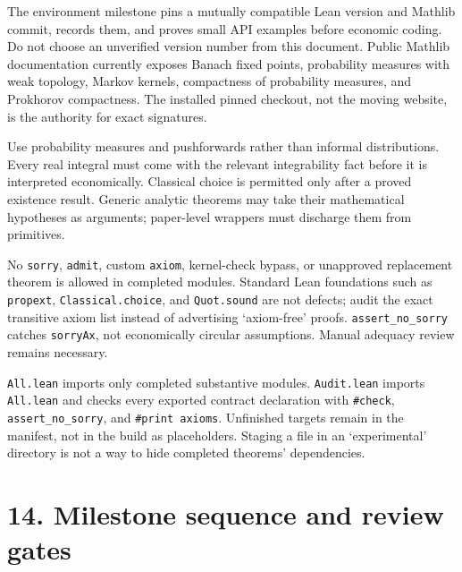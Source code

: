 \documentclass[
  11pt,
]{article}
\begin{document}
The environment milestone pins a mutually compatible Lean version and
Mathlib commit, records them, and proves small API examples before
economic coding. Do not choose an unverified version number from this
document. Public Mathlib documentation currently exposes Banach fixed
points, probability measures with weak topology, Markov kernels,
compactness of probability measures, and Prokhorov compactness. The
installed pinned checkout, not the moving website, is the authority for
exact signatures.

Use probability measures and pushforwards rather than informal
distributions. Every real integral must come with the relevant
integrability fact before it is interpreted economically. Classical
choice is permitted only after a proved existence result. Generic
analytic theorems may take their mathematical hypotheses as arguments;
paper-level wrappers must discharge them from primitives.

No \texttt{sorry}, \texttt{admit}, custom \texttt{axiom}, kernel-check
bypass, or unapproved replacement theorem is allowed in completed
modules. Standard Lean foundations such as \texttt{propext},
\texttt{Classical.choice}, and \texttt{Quot.sound} are not defects;
audit the exact transitive axiom list instead of advertising
`axiom-free' proofs. \texttt{assert\_no\_sorry} catches
\texttt{sorryAx}, not economically circular assumptions. Manual adequacy
review remains necessary.

\texttt{All.lean} imports only completed substantive modules.
\texttt{Audit.lean} imports \texttt{All.lean} and checks every exported
contract declaration with \texttt{\#check}, \texttt{assert\_no\_sorry},
and \texttt{\#print\ axioms}. Unfinished targets remain in the manifest,
not in the build as placeholders. Staging a file in an `experimental'
directory is not a way to hide completed theorems' dependencies.

\section{14. Milestone sequence and review
gates}\label{milestone-sequence-and-review-gates}
\end{document}
